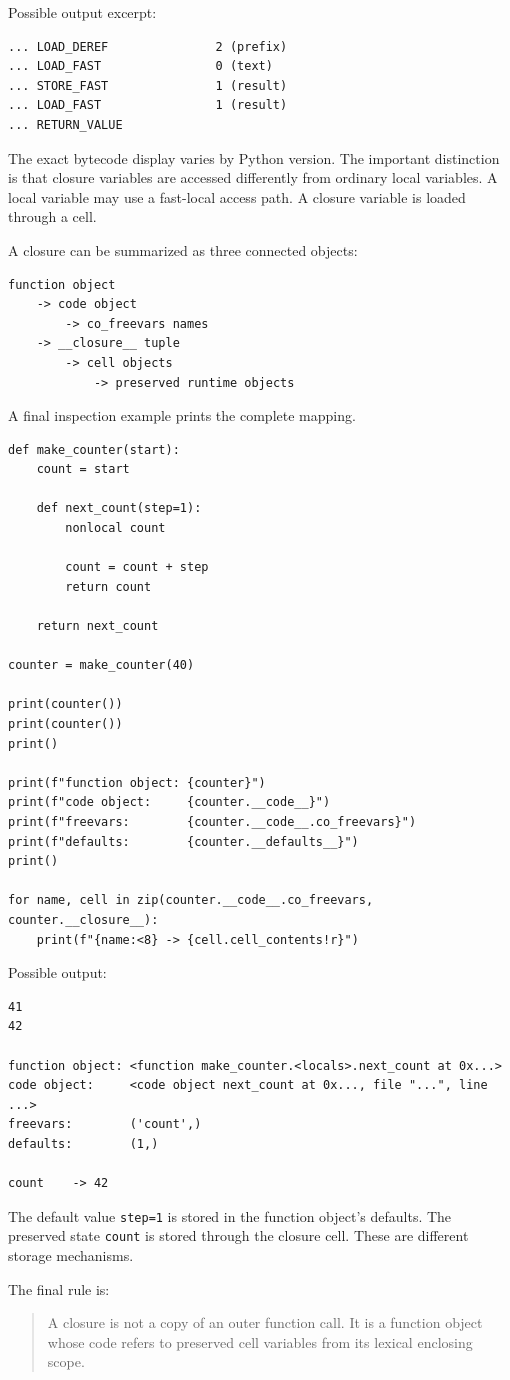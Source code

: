 Possible output excerpt:

\begin{verbatim}
... LOAD_DEREF               2 (prefix)
... LOAD_FAST                0 (text)
... STORE_FAST               1 (result)
... LOAD_FAST                1 (result)
... RETURN_VALUE
\end{verbatim}

The exact bytecode display varies by Python version. The important distinction is that closure variables are accessed differently from ordinary local variables. A local variable may use a fast-local access path. A closure variable is loaded through a cell.

A closure can be summarized as three connected objects:

\begin{verbatim}
function object
    -> code object
        -> co_freevars names
    -> __closure__ tuple
        -> cell objects
            -> preserved runtime objects
\end{verbatim}

A final inspection example prints the complete mapping.

\begin{verbatim}
def make_counter(start):
    count = start

    def next_count(step=1):
        nonlocal count

        count = count + step
        return count

    return next_count

counter = make_counter(40)

print(counter())
print(counter())
print()

print(f"function object: {counter}")
print(f"code object:     {counter.__code__}")
print(f"freevars:        {counter.__code__.co_freevars}")
print(f"defaults:        {counter.__defaults__}")
print()

for name, cell in zip(counter.__code__.co_freevars, counter.__closure__):
    print(f"{name:<8} -> {cell.cell_contents!r}")
\end{verbatim}

Possible output:

\begin{verbatim}
41
42

function object: <function make_counter.<locals>.next_count at 0x...>
code object:     <code object next_count at 0x..., file "...", line ...>
freevars:        ('count',)
defaults:        (1,)

count    -> 42
\end{verbatim}

The default value \texttt{step=1} is stored in the function object's defaults. The preserved state \texttt{count} is stored through the closure cell. These are different storage mechanisms.

The final rule is:

\begin{quote}
A closure is not a copy of an outer function call. It is a function object whose code refers to preserved cell variables from its lexical enclosing scope.
\end{quote}